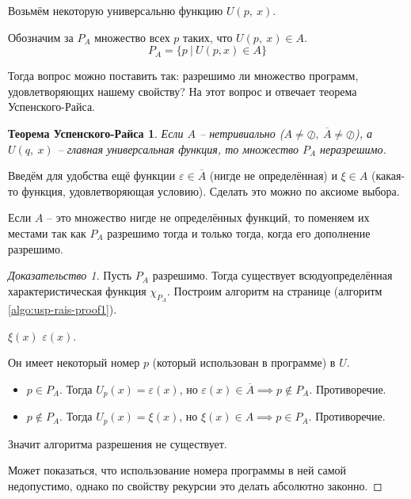 \documentclass[a4paper, 12pt]{article}
\newtheorem*{usp-rais}{Теорема Успенского-Райса}
\begin{document}
Возьмём некоторую универсальню функцию $U(p,\ x)$.

Обозначим за $P_A$ множество всех $p$ таких, что $U(p,\ x) \in A$.
\[
P_A = \{p\ |\ U(p, x) \in A\}
\]


Тогда вопрос можно поставить так: разрешимо ли множество
программ, удовлетворяющих нашему свойству? На этот вопрос и отвечает теорема
Успенского-Райса.
\begin{usp-rais}
   Если $A$ -- нетривиально ($A \neq \oslash,\ \overline{A} \neq \oslash$), а $U(q,\ x)$ -- главная универсальная функция, то множество $P_A$ неразрешимо.
\end{usp-rais}
Введём для удобства ещё функции $\varepsilon \in \overline{A}$ (нигде не 
определённая) и $\xi \in A$ (какая-то функция, удовлетворяющая условию).
Сделать это можно по аксиоме выбора.

Если $A$ -- это множество нигде не определённых функций, то поменяем их
местами так как $P_A$ разрешимо тогда и только тогда, когда его
дополнение разрешимо.

\begin{proof}[Доказательство 1]
    Пусть $P_A$ разрешимо. Тогда существует всюдуопределённая
    характеристическая функция $\chi_{P_A}$. 
    Построим алгоритм на странице \pageref{algo:usp-rais-proof1} 
    (алгоритм \ref{algo:usp-rais-proof1}).
    \begin{algorithm}
        \caption{Алгоритм, создающий противоречие для разрешимости $P_A$ в док-ве 1}
        \label{algo:usp-rais-proof1}
        \begin{algorithmic}
                    \State \Return $\xi(x)$
                \Else 
                    \State \Return $\varepsilon(x)$.
                \EndIf
            \EndFunction
        \end{algorithmic}
    \end{algorithm}
    
    Он имеет некоторый номер $p$ (который использован в программе) в $U$.
    \begin{itemize}
            \item $p \in P_A$. Тогда $U_p(x) = \varepsilon(x)$,
                но $\varepsilon(x) \in \overline{A} \implies
                p \notin P_A$. Противоречие.

            \item $p \notin P_A$. Тогда $U_p(x) = \xi(x)$, но
                $\xi(x) \in A \implies p \in P_A$. Противоречие.
    \end{itemize}
    Значит алгоритма разрешения не существует.

    Может показаться, что использование номера программы в ней самой недопустимо,
    однако по свойству рекурсии это делать абсолютно законно.
\end{proof}
\end{document}
